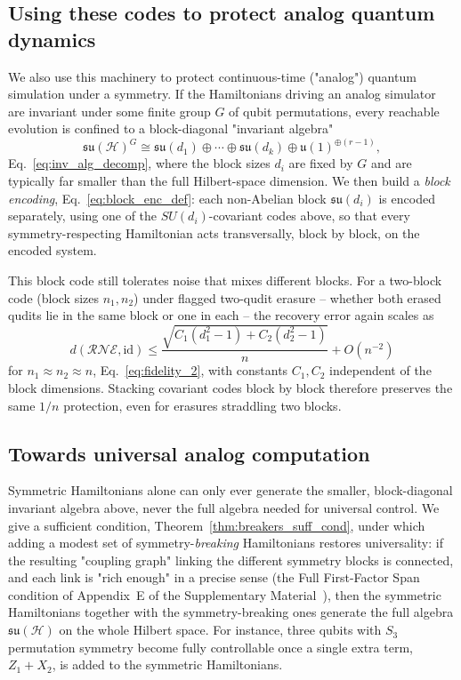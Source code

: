 \documentclass[10pt,twocolumn,superscriptaddress,aps,amsmath,amssymb,citeautoscript,floatfix,prx]{revtex4-2}
\newcounter{alg}
\theoremstyle{plain}
\theoremstyle{plain}
\theoremstyle{plain}
\theoremstyle{plain}
\theoremstyle{plain}
\theoremstyle{plain}
\begin{document}
\subsection{Using these codes to protect analog quantum dynamics}\label{subsec:summary_analog}
 
We also use this machinery to protect continuous-time ("analog") quantum simulation under a symmetry. If the Hamiltonians driving an analog simulator are invariant under some finite group $G$ of qubit permutations, every reachable evolution is confined to a block-diagonal "invariant algebra"
$$
\mathfrak{su}(\mathcal H)^G\cong \mathfrak{su}(d_1)\oplus\cdots\oplus\mathfrak{su}(d_k)\oplus\mathfrak u(1)^{\oplus(r-1)},
$$
Eq.~\eqref{eq:inv_alg_decomp}, where the block sizes $d_i$ are fixed by $G$ and are typically far smaller than the full Hilbert-space dimension. We then build a \emph{block encoding}, Eq.~\eqref{eq:block_enc_def}: each non-Abelian block $\mathfrak{su}(d_i)$ is encoded separately, using one of the $SU(d_i)$-covariant codes above, so that every symmetry-respecting Hamiltonian acts transversally, block by block, on the encoded system.
 
This block code still tolerates noise that mixes different blocks. For a two-block code (block sizes $n_1,n_2$) under flagged two-qudit erasure -- whether both erased qudits lie in the same block or one in each -- the recovery error again scales as
$$
d(\mathcal R\mathcal N\mathcal E,\mathrm{id})\le\frac{\sqrt{C_1(d_1^2-1)+C_2(d_2^2-1)}}{n}+O(n^{-2})
$$
for $n_1\approx n_2\approx n$, Eq.~\eqref{eq:fidelity_2}, with constants $C_1,C_2$ independent of the block dimensions. Stacking covariant codes block by block therefore preserves the same $1/n$ protection, even for erasures straddling two blocks.
 
\subsection{Towards universal analog computation}\label{subsec:summary_universal}
 
Symmetric Hamiltonians alone can only ever generate the smaller, block-diagonal invariant algebra above, never the full algebra needed for universal control. We give a sufficient condition, Theorem~\ref{thm:breakers_suff_cond}, under which adding a modest set of symmetry-\emph{breaking} Hamiltonians restores universality: if the resulting "coupling graph" linking the different symmetry blocks is connected, and each link is "rich enough" in a precise sense (the Full First-Factor Span condition of Appendix~E of the Supplementary Material~\cite{SuppMat}), then the symmetric Hamiltonians together with the symmetry-breaking ones generate the full algebra $\mathfrak{su}(\mathcal H)$ on the whole Hilbert space. For instance, three qubits with $S_3$ permutation symmetry become fully controllable once a single extra term, $Z_1+X_2$, is added to the symmetric Hamiltonians.
 
\end{document}
